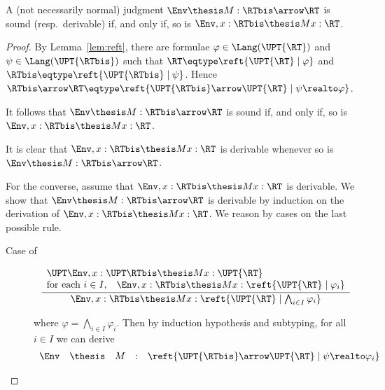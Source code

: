 \begin{lemma}
\label{lem:proof:main:eta:fun}
A (not necessarily normal) judgment
$\Env \thesis M : \RTbis \arrow \RT$
is sound (resp.\ derivable)
if, and only if,
so is
$\Env, x:\RTbis \thesis M x : \RT$.
\end{lemma}

\begin{proof}
By Lemma~\ref{lem:reft},
there are formulae
$\varphi \in \Lang(\UPT{\RT})$
and
$\psi \in \Lang(\UPT{\RTbis})$
such that
$\RT \eqtype \reft{\UPT{\RT} \mid \varphi}$
and
$\RTbis \eqtype \reft{\UPT{\RTbis} \mid \psi}$.
Hence
\(
  \RTbis \arrow \RT
  \eqtype
  \reft{\UPT{\RTbis} \arrow \UPT{\RT} \mid \psi \realto \varphi}
\).


It follows that
$\Env \thesis M : \RTbis \arrow \RT$
is sound if, and only if,
so is $\Env,x:\RTbis \thesis M x : \RT$.

It is clear that $\Env, x:\RTbis \thesis M x : \RT$
is derivable whenever so is
$\Env \thesis M : \RTbis \arrow \RT$.

For the converse, assume that
$\Env,x:\RTbis \thesis M x : \RT$
is derivable.
We show that
$\Env \thesis M : \RTbis \arrow \RT$
is derivable by induction on the derivation of
$\Env,x:\RTbis \thesis M x : \RT$.
We reason by cases on the last possible rule.
\begin{description}
\item[Case of]
\[
\dfrac{
  \begin{array}{l}
  \UPT\Env, x : \UPT\RTbis \thesis M x : \UPT{\RT}
  \\
  \text{for each $i \in I$,}\quad
  \Env,x:\RTbis \thesis M x : \reft{\UPT{\RT} \mid \varphi_i}
  \end{array}}
  {\Env,x:\RTbis \thesis M x : \reft{\UPT{\RT} \mid \bigwedge_{i \in I} \varphi_i}}
\]

\noindent
where $\varphi = \bigwedge_{i \in I}\varphi_i$.
Then by induction hypothesis and subtyping,
for all $i \in I$ we can derive
\[
\begin{array}{*{5}{l}}
  \Env
& \thesis
& M
& :
& \reft{\UPT{\RTbis} \arrow \UPT{\RT} \mid \psi \realto \varphi_i}
\end{array}
\]


\end{description}
\end{proof}
